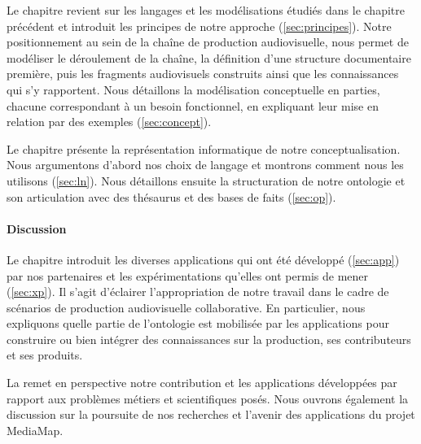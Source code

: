Le chapitre  revient sur les langages et les modélisations étudiés dans le chapitre précédent et introduit les principes de notre approche (\ref{sec:principes}).
Notre positionnement au sein de la chaîne de production audiovisuelle, nous permet de modéliser le déroulement de la chaîne, la définition d'une structure documentaire première, puis les fragments audiovisuels construits ainsi que les connaissances qui s'y rapportent.
Nous détaillons la modélisation conceptuelle en parties, chacune correspondant à un besoin fonctionnel, en expliquant leur mise en relation par des exemples (\ref{sec:concept}).

Le chapitre  présente la représentation informatique de notre conceptualisation.
Nous argumentons d'abord nos choix de langage et montrons comment nous les utilisons (\ref{sec:ln}). 
Nous détaillons ensuite la structuration de notre ontologie et son articulation avec des thésaurus et des bases de faits (\ref{sec:op}).

\paragraph{Discussion}

Le chapitre  introduit les diverses applications qui ont été développé (\ref{sec:app}) par nos partenaires et les expérimentations qu'elles ont permis de mener (\ref{sec:xp}).
Il s'agit d'éclairer l'appropriation de notre travail dans le cadre de scénarios de production audiovisuelle collaborative.
En particulier, nous expliquons quelle partie de l'ontologie est mobilisée par les applications pour construire ou bien intégrer des connaissances sur la production, ses contributeurs et ses produits.

La  remet en perspective notre contribution et les applications développées par rapport aux problèmes métiers et scientifiques posés.
Nous ouvrons également la discussion sur la poursuite de nos recherches et l'avenir des applications du projet MediaMap.
